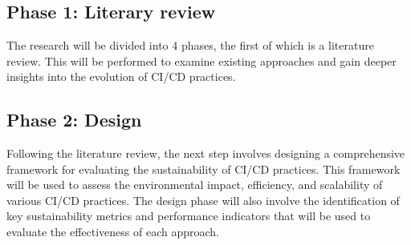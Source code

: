
\chapter{}%
\label{ch:methodologie}


\section{Phase 1: Literary review}
The research will be divided into 4 phases, the first of which is a literature review. This will be performed to examine existing approaches and gain deeper insights into the evolution of CI/CD practices.

\section{Phase 2: Design}
Following the literature review, the next step involves designing a comprehensive framework for evaluating the sustainability of CI/CD practices. This framework will be used to assess the environmental impact, efficiency, and scalability of various CI/CD practices. The design phase will also involve the identification of key sustainability metrics and performance indicators that will be used to evaluate the effectiveness of each approach.

